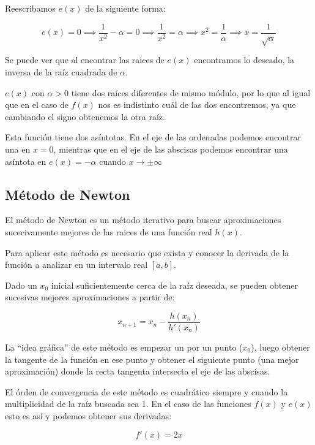 Reescribamos $e(x)$ de la siguiente forma:

\[
    e(x) = 0 \implies
    \frac{ 1 }{ x^2 } - \alpha = 0 \implies
    \frac{ 1 }{ x^2 } = \alpha \implies
    x^2 = \frac{ 1 }{ \alpha } \implies
    x = \frac{ 1 }{ \sqrt{\alpha} }
\]

Se puede ver que al encontrar las raices de $e(x)$ encontramos lo deseado, la
inversa de la raíz cuadrada de $\alpha$.

$e(x)$ con $\alpha > 0$ tiene dos raíces diferentes de mismo módulo, por lo que
al igual que en el caso de $f(x)$ nos es indistinto cuál de las dos
encontremos, ya que cambiando el signo obtenemos la otra raíz.

Esta función tiene dos asíntotas. En el eje de las ordenadas podemos encontrar
una en $x = 0$, mientras que en el eje de las abscisas podemos encontrar una
asíntota en $e(x) = - \alpha$ cuando $x \to \pm \infty$

\subsection{Método de Newton}

El método de Newton es un método iterativo para buscar aproximaciones
sucecivamente mejores de las raices de una función real $h(x)$.

Para aplicar este método es necesario que exista y conocer la derivada de la
función a analizar en un intervalo real $[a, b]$.

Dado un $x_0$ inicial suficientemente cerca de la raíz deseada, se pueden
obtener sucesivas mejores aproximaciones a partir de:

\begin{equation}\label{newton}
    x_{n + 1} = x_n - \frac{ h(x_n) }{ h'(x_n) }
\end{equation}

La ``idea gráfica'' de este método es empezar un por un punto ($x_0$), luego
obtener la tangente de la función en ese punto y obtener el siguiente punto
(una mejor aproximación) donde la recta tangenta intersecta el eje de las
abscisas.

El órden de convergencia de este método es cuadrático siempre y cuando la
multiplicidad de la raíz buscada sea 1. En el caso de las funciones $f(x)$ y
$e(x)$ esto es así y podemos obtener sus derivadas:

\begin{equation}\label{f_x}
    f'(x) = 2x
\end{equation}

